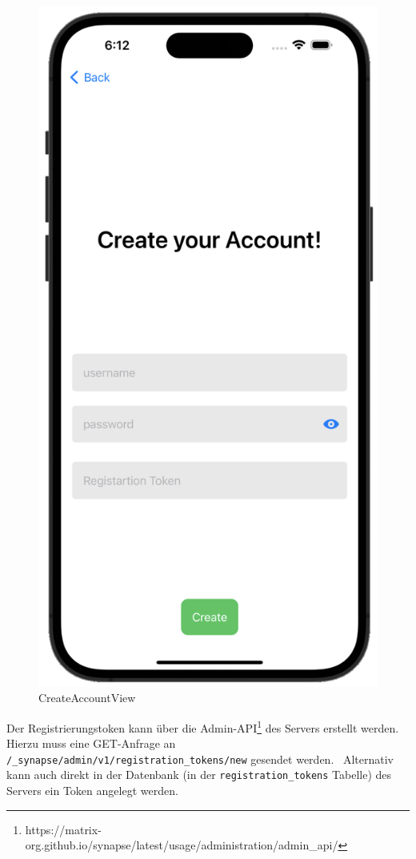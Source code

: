     \begin{figure}[h]
        \includegraphics[scale=0.5]{accountcreate_white}
        \centering
        \caption{CreateAccountView}\label{fig:createaccountview}
    \end{figure}
    Der Registrierungstoken kann über die Admin-API\footnote{https://matrix-org.github.io/synapse/latest/usage/administration/admin\_api/} des Servers erstellt werden.
    Hierzu muss eine GET-Anfrage an \texttt{/\_synapse/admin/v1/registration\_tokens/new} gesendet werden.~\cite{synapseregistartiontoken}
    Alternativ kann auch direkt in der Datenbank (in der \texttt{registration\_tokens} Tabelle) des Servers ein Token angelegt werden.

